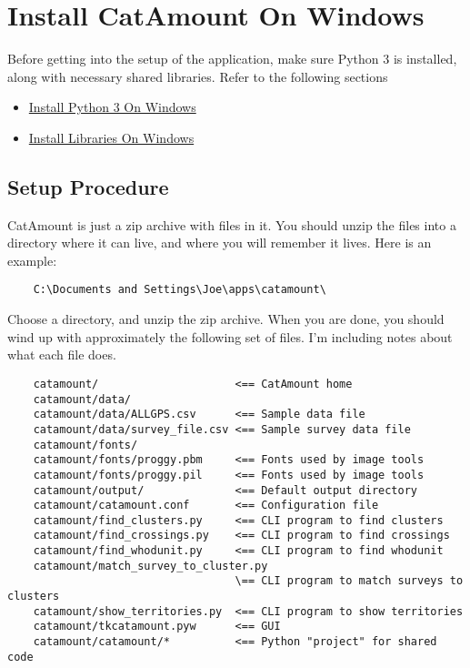 \chapter{Install CatAmount On Windows}
\hypertarget{windows-install-catamount}{}

Before getting into the setup of the application, make sure Python 3
is installed, along with necessary shared libraries. Refer to the
following sections

\begin{itemize}
\item \hyperlink{windows-install-python}{Install Python 3 On Windows}
\item \hyperlink{windows-install-libraries}{Install Libraries On Windows}
\end{itemize}

\section{Setup Procedure}

CatAmount is just a zip archive with files in it. You should unzip
the files into a directory where it can live, and where you will
remember it lives. Here is an example:

\begin{verbatim}
    C:\Documents and Settings\Joe\apps\catamount\
\end{verbatim}

Choose a directory, and unzip the zip archive. When you are done,
you should wind up with approximately the following set of files.
I'm including notes about what each file does.

\begin{verbatim}
    catamount/                     <== CatAmount home
    catamount/data/
    catamount/data/ALLGPS.csv      <== Sample data file
    catamount/data/survey_file.csv <== Sample survey data file
    catamount/fonts/
    catamount/fonts/proggy.pbm     <== Fonts used by image tools
    catamount/fonts/proggy.pil     <== Fonts used by image tools
    catamount/output/              <== Default output directory
    catamount/catamount.conf       <== Configuration file
    catamount/find_clusters.py     <== CLI program to find clusters
    catamount/find_crossings.py    <== CLI program to find crossings
    catamount/find_whodunit.py     <== CLI program to find whodunit
    catamount/match_survey_to_cluster.py
                                   \== CLI program to match surveys to clusters
    catamount/show_territories.py  <== CLI program to show territories
    catamount/tkcatamount.pyw      <== GUI
    catamount/catamount/*          <== Python "project" for shared code
\end{verbatim}


